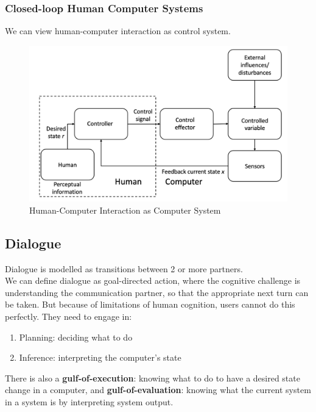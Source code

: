 \documentclass{article}
\begin{document}
\subsubsection{Closed-loop Human Computer Systems}
We can view human-computer interaction as control system.
\begin{figure}[H]
    \centering
    \includegraphics[width=0.5\linewidth]{Pictures/Screenshot 2023-03-01 at 11.53.30.png}
    \caption{Human-Computer Interaction as Computer System}
\end{figure}
\subsection{Dialogue}
Dialogue is modelled as transitions between 2 or more partners. \\
We can define dialogue as goal-directed action, where the cognitive challenge is understanding the communication partner, so that the appropriate next turn can be taken. But because of limitations of human cognition, users cannot do this perfectly. They need to engage in:
\begin{enumerate}
    \item Planning: deciding what to do
    \item Inference: interpreting the computer's state
\end{enumerate}
There is also a \textbf{gulf-of-execution}: knowing what to do to have a desired state change in a computer, and \textbf{gulf-of-evaluation}: knowing what the current system in a system is by interpreting system output.
\end{document}
